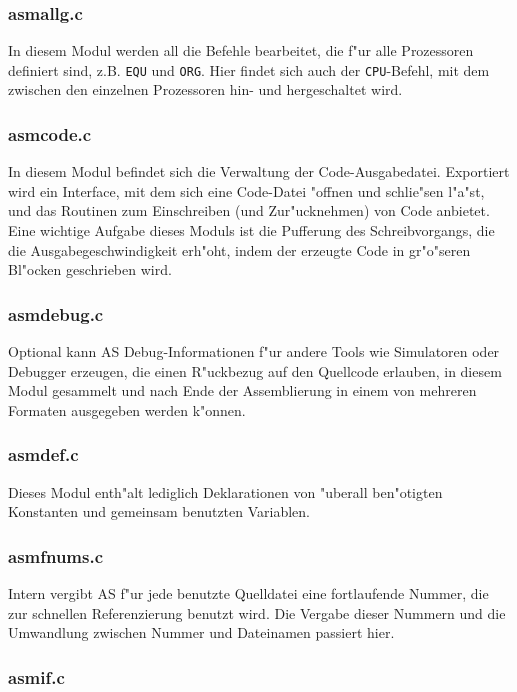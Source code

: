 \documentclass[12pt,a4paper,twoside]{report}
\newcommand{\tty}[1]{{\tt #1}}
\newcommand{\asname}{AS}
\begin{document}
\subsubsection{asmallg.c}

In diesem Modul werden all die Befehle bearbeitet, die f"ur alle Prozessoren
definiert sind, z.B. \tty{EQU} und \tty{ORG}.  Hier findet sich auch der
\tty{CPU}-Befehl, mit dem zwischen den einzelnen Prozessoren hin- und
hergeschaltet wird.

\subsubsection{asmcode.c}

In diesem Modul befindet sich die Verwaltung der Code-Ausgabedatei.
Exportiert wird ein Interface, mit dem sich eine Code-Datei "offnen
und schlie"sen l"a"st, und das Routinen zum Einschreiben (und
Zur"ucknehmen) von Code anbietet.  Eine wichtige Aufgabe dieses Moduls
ist die Pufferung des Schreibvorgangs, die die Ausgabegeschwindigkeit
erh"oht, indem der erzeugte Code in gr"o"seren Bl"ocken geschrieben wird.

\subsubsection{asmdebug.c}

Optional kann \asname{} Debug-Informationen f"ur andere Tools wie Simulatoren
oder Debugger erzeugen, die einen R"uckbezug auf den Quellcode erlauben,
in diesem Modul gesammelt und nach Ende der Assemblierung in einem von
mehreren Formaten ausgegeben werden k"onnen.

\subsubsection{asmdef.c}

Dieses Modul enth"alt lediglich Deklarationen von "uberall ben"otigten
Konstanten und gemeinsam benutzten Variablen.

\subsubsection{asmfnums.c}

Intern vergibt \asname{} f"ur jede benutzte Quelldatei eine fortlaufende Nummer,
die zur schnellen Referenzierung benutzt wird.  Die Vergabe dieser Nummern
und die Umwandlung zwischen Nummer und Dateinamen passiert hier.

\subsubsection{asmif.c}
\end{document}
